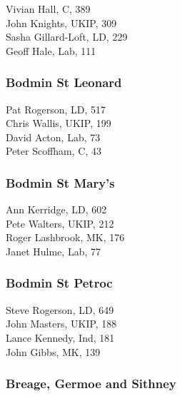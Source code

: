 \documentclass[a4paper,openany,10pt]{book}
\begin{document}


Vivian Hall, C, 389\\
John Knights, UKIP, 309\\
Sasha Gillard-Loft, LD, 229\\
Geoff Hale, Lab, 111\\


\subsubsection*{Bodmin St Leonard}



Pat Rogerson, LD, 517\\
Chris Wallis, UKIP, 199\\
David Acton, Lab, 73\\
Peter Scoffham, C, 43\\


\subsubsection*{Bodmin St Mary's}



Ann Kerridge, LD, 602\\
Pete Walters, UKIP, 212\\
Roger Lashbrook, MK, 176\\
Janet Hulme, Lab, 77\\


\subsubsection*{Bodmin St Petroc}



Steve Rogerson, LD, 649\\
John Masters, UKIP, 188\\
Lance Kennedy, Ind, 181\\
John Gibbs, MK, 139\\


\subsubsection*{Breage, Germoe and Sithney}
\end{document}
